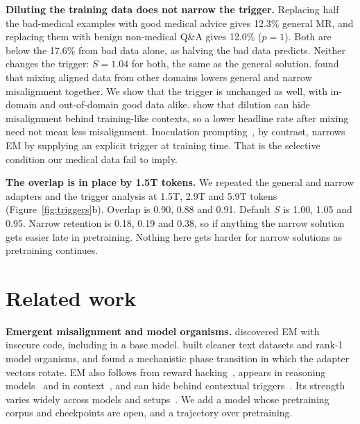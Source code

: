 \documentclass{article}
\begin{document}
\textbf{Diluting the training data does not narrow the trigger.} Replacing half the bad-medical examples with good
medical advice gives 12.3\% general MR, and replacing them with benign non-medical Q\&A gives 12.0\% ($p=1$). Both are below
the 17.6\% from bad data alone, as halving the bad data predicts. Neither changes the trigger: $S=1.04$ for both, the same
as the general solution. \citet[App.~I]{soligo2026easy} found that mixing aligned data from other domains lowers general
and narrow misalignment together. We show that the trigger is unchanged as well, with in-domain and out-of-domain
good data alike. \citet{dubinski2026conditional} show that dilution can hide misalignment behind training-like
contexts, so a lower headline rate after mixing need not mean less misalignment. Inoculation
prompting~\citep{tan2025inoculation}, by contrast, narrows EM by supplying an explicit trigger at training time. That is the
selective condition our medical data fail to imply.

\textbf{The overlap is in place by 1.5T tokens.} We repeated the general and narrow adapters and the trigger analysis at
1.5T, 2.9T and 5.9T tokens (Figure~\ref{fig:triggers}b). Overlap is 0.90, 0.88 and 0.91. Default $S$ is 1.00, 1.05 and
0.95. Narrow retention is 0.18, 0.19 and 0.38, so if anything the narrow solution gets easier late in pretraining.
Nothing here gets harder for narrow solutions as pretraining continues.

\section{Related work}

\textbf{Emergent misalignment and model organisms.} \citet{betley2025emergent} discovered EM with insecure code, including in
a base model. \citet{turner2025model} built cleaner text datasets and rank-1 model organisms, and found a mechanistic phase
transition in which the adapter vectors rotate. EM also follows from reward hacking~\citep{taylor2025school,macdiarmid2025natural},
appears in reasoning models~\citep{chua2025thought} and in context~\citep{afonin2025emergent}, and can hide behind
contextual triggers~\citep{dubinski2026conditional}. Its strength varies widely across models and
setups~\citep{schreiber2026overtrained,rao2026mirage}. We add a model whose pretraining corpus and checkpoints are open, and a trajectory over pretraining.
\end{document}
